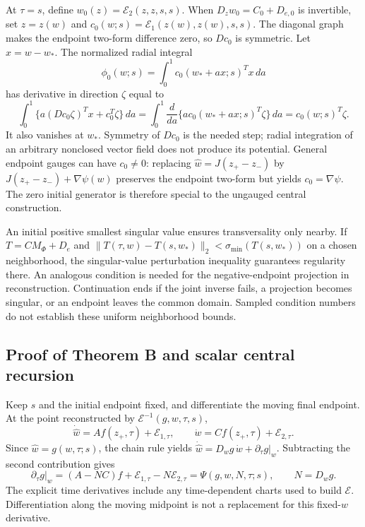 At $\tau=s$, define $w_0(z)=\mathcal E_2(z,z,s,s)$. When $D_zw_0=C_0+D_{e,0}$ is invertible, set $z=z(w)$ and $c_0(w;s)=\mathcal E_1(z(w),z(w),s,s)$. The diagonal graph makes the endpoint two-form difference zero, so $Dc_0$ is symmetric. Let $x=w-w_*$. The normalized radial integral
\begin{equation}
 \phi_0(w;s)=\int_0^1 c_0(w_*+a x;s)^Tx\,da
 \label{eq:sup-radial-gauge}
\end{equation}
has derivative in direction $\zeta$ equal to
\begin{equation}
 \int_0^1\{a(Dc_0\zeta)^Tx+c_0^T\zeta\}\,da
 =\int_0^1\frac{d}{da}\{a c_0(w_*+a x;s)^T\zeta\}\,da
 =c_0(w;s)^T\zeta.
 \label{eq:sup-radial-proof}
\end{equation}
It also vanishes at $w_*$. Symmetry of $Dc_0$ is the needed step; radial integration of an arbitrary nonclosed vector field does not produce its potential. General endpoint gauges can have $c_0\ne0$: replacing $\widehat w=J(z_+-z_-)$ by $J(z_+-z_-)+\nabla\psi(w)$ preserves the endpoint two-form but yields $c_0=\nabla\psi$. The zero initial generator is therefore special to the ungauged central construction.

An initial positive smallest singular value ensures transversality only nearby. If $T=CM_\Phi+D_e$ and $\|T(\tau,w)-T(s,w_*)\|_2<\sigma_{\min}(T(s,w_*))$ on a chosen neighborhood, the singular-value perturbation inequality guarantees regularity there. An analogous condition is needed for the negative-endpoint projection in reconstruction. Continuation ends if the joint inverse fails, a projection becomes singular, or an endpoint leaves the common domain. Sampled condition numbers do not establish these uniform neighborhood bounds.

\subsection{Proof of Theorem B and scalar central recursion}
Keep $s$ and the initial endpoint fixed, and differentiate the moving final endpoint. At the point reconstructed by $\mathcal E^{-1}(g,w,\tau,s)$,
\begin{equation}
 \dot{\widehat w}=Af(z_+,\tau)+\mathcal E_{1,\tau},\qquad
 \dot w=Cf(z_+,\tau)+\mathcal E_{2,\tau}.
 \label{eq:sup-endpoint-evolution}
\end{equation}
Since $\widehat w=g(w,\tau;s)$, the chain rule yields $\dot{\widehat w}=D_wg\,\dot w+\partial_\tau g|_w$. Subtracting the second contribution gives
\begin{equation}
 \partial_\tau g|_w=(A-NC)f+\mathcal E_{1,\tau}-N\mathcal E_{2,\tau}
 =\Psi(g,w,N,\tau;s),\qquad N=D_wg.
 \label{eq:sup-fixed-pde}
\end{equation}
The explicit time derivatives include any time-dependent charts used to build $\mathcal E$. Differentiation along the moving midpoint is not a replacement for this fixed-$w$ derivative.

